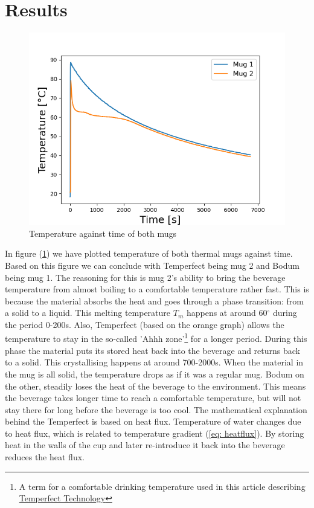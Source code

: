 \documentclass[reprint,english,notitlepage]{revtex4-2}
\begin{document}
\section{Results}
\begin{figure}[h]
  \includegraphics[scale=0.5]{temp.png}
  \caption{Temperature against time of both mugs}\label{fig:temperature}
\end{figure}
In figure (\ref{fig:temperature}) we have plotted temperature of both thermal mugs against time. Based on this figure we can conclude with Temperfect being mug 2 and Bodum being mug 1. The reasoning for this is mug 2's ability to bring the beverage temperature from almost boiling to a comfortable temperature rather fast. This is because the material absorbs the heat and goes through a phase transition: from a solid to a liquid. This melting temperature $T_m$ happens at around 60$^{\circ}$ during the period 0-200s.
Also, Temperfect (based on the orange graph) allows the temperature to stay in the so-called 'Ahhh zone'\footnote{A term for a comfortable drinking temperature used in this article describing \href{https://joeveo.com/pages/the-temperfect-mug}{Temperfect Technology}} for a longer period. During this phase the material puts its stored heat back into the beverage and returns back to a solid. This crystallising happens at around 700-2000s.
When the material in the mug is all solid, the temperature drops as if it was a regular mug.
Bodum on the other, steadily loses the heat of the beverage to the environment. This means the beverage takes longer time to reach a comfortable temperature, but will not stay there for long before the beverage is too cool.
The mathematical explanation behind the Temperfect is based on heat flux. Temperature of water changes due to heat flux, which is related to temperature gradient (\ref{eq: heatflux}). By storing heat in the walls of the cup and later re-introduce it back into the beverage reduces the heat flux.
\end{document}
